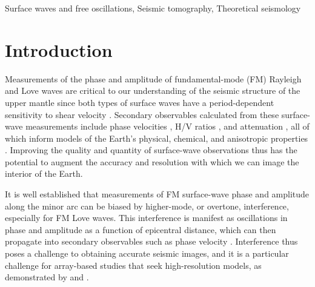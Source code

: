 \documentclass[extra,mreferee]{gji}
\begin{document}
\begin{keywords}
Surface waves and free oscillations, Seismic tomography, Theoretical seismology
\end{keywords}

\section{Introduction}
Measurements of the phase and amplitude of fundamental-mode (FM) Rayleigh  and Love waves are critical to our understanding of the seismic structure of the upper mantle since both types of surface waves have a period-dependent sensitivity to shear velocity \citep[e.g.][]{nettles2008radially}. Secondary observables calculated from these surface-wave measurements include phase velocities \citep[e.g.][]{lin2011helmholtz, eddy2018age}, H/V ratios \citep[e.g.][]{tanimoto2008zh}, and attenuation \citep[e.g.][]{dalton2006global}, all of which inform models of the Earth's physical, chemical, and anisotropic properties \citep[e.g.][]{dalton2017thermal,altoe2020thermo,russell2019high}. Improving the quality and quantity of surface-wave observations thus has the potential to augment the accuracy and resolution with which we can image the interior of the Earth.

It is well established that measurements of FM surface-wave phase and amplitude along the minor arc can be biased by higher-mode, or overtone, interference, especially for FM Love waves. This interference is manifest as oscillations in phase and amplitude as a function of epicentral distance, which can then propagate into secondary observables such as phase velocity \citep[e.g.][]{thatcher1969higher,foster2014overtone,hariharan2020evidence}. Interference thus poses a challenge to obtaining accurate seismic images, and it is a particular challenge for array-based studies that seek high-resolution models, as demonstrated by  \citet{foster2014overtone} and \citet{hariharan2020evidence}. 
\end{document}

